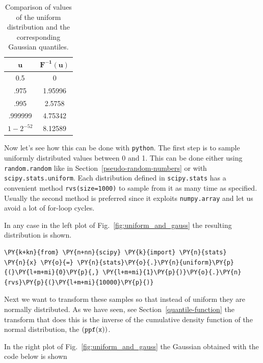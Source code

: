 \begin{table}[h]
  \centering
  \begin{tabular}{|c|c|}
    \hline
    \(\mathbf{u}\) & \(\mathbf{F^{-1}(u)}\) \\
    \hline
    0.5 & 0 \\
    \hline
    .975 & 1.95996 \\
    \hline
    .995 & 2.5758 \\
    \hline
    .999999 & 4.75342 \\
    \hline
    \(1-2^{-52}\) & 8.12589 \\
    \hline
  \end{tabular}
  \caption{Comparison of values of the uniform distribution and the corresponding Gaussian quantiles.}
\label{tab:transformation}
\end{table}

Now let's see how this can be done with \texttt{python}. The first step is to sample
uniformly distributed values between 0 and 1. This can be done either using \texttt{random.random} like in Section~\ref{pseudo-random-numbers} or with \texttt{scipy.stats.uniform}. Each distribution defined in \texttt{scipy.stats} has a convenient method \texttt{rvs(size=1000)} to sample from it as many time as specified. Usually the second method is preferred since it exploits \texttt{numpy.array} and let us avoid a lot of for-loop cycles.

 In any case in the left plot of Fig.~\ref{fig:uniform_and_gauss} the resulting distribution is shown.

\begin{tcolorbox}[breakable, size=fbox, boxrule=1pt, pad at break*=1mm,colback=cellbackground, colframe=cellborder]
\begin{Verbatim}[commandchars=\\\{\}]
\PY{k+kn}{from} \PY{n+nn}{scipy} \PY{k}{import} \PY{n}{stats}
\PY{n}{x} \PY{o}{=} \PY{n}{stats}\PY{o}{.}\PY{n}{uniform}\PY{p}{(}\PY{l+m+mi}{0}\PY{p}{,} \PY{l+m+mi}{1}\PY{p}{)}\PY{o}{.}\PY{n}{rvs}\PY{p}{(}\PY{l+m+mi}{10000}\PY{p}{)}
\end{Verbatim}
\end{tcolorbox}

Next we want to transform these samples so that instead of uniform they
are normally distributed. As we have seen, see Section~\ref{quantile-function} the transform that does this
is the inverse of the cumulative density function of the normal 
distribution, the \((\tt{ppf(x))}\). 

In the right plot of Fig.~\ref{fig:uniform_and_gauss} the Gaussian obtained 
with the code below is shown

